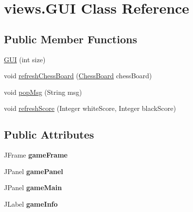 \hypertarget{classviews_1_1_g_u_i}{\section{views.\+G\+U\+I Class Reference}
\label{classviews_1_1_g_u_i}
}
\subsection*{Public Member Functions}
\begin{DoxyCompactItemize}
\item 
\hyperlink{classviews_1_1_g_u_i_aa8f0b37b9ad363a2f41e2471ea1ab903}{G\+U\+I} (int size)
\item 
void \hyperlink{classviews_1_1_g_u_i_aa32d4db201e60136cf0a47eb5fd81614}{refresh\+Chess\+Board} (\hyperlink{classmodel_core_1_1_chess_board}{Chess\+Board} chess\+Board)
\item 
void \hyperlink{classviews_1_1_g_u_i_ad319ff8d77e9f4915e42dde3a665423a}{pop\+Msg} (String msg)
\item 
void \hyperlink{classviews_1_1_g_u_i_ad46f677c2c21d3e6a82408baf061126a}{refresh\+Score} (Integer white\+Score, Integer black\+Score)
\end{DoxyCompactItemize}
\subsection*{Public Attributes}
\begin{DoxyCompactItemize}
\item 
\hypertarget{classviews_1_1_g_u_i_ab848d4682f1a4d057a4c13b76ac18e99}{J\+Frame {\bfseries game\+Frame}}\label{classviews_1_1_g_u_i_ab848d4682f1a4d057a4c13b76ac18e99}

\item 
\hypertarget{classviews_1_1_g_u_i_a19215292f3d3e894912e5263ff3e1dad}{J\+Panel {\bfseries game\+Panel}}\label{classviews_1_1_g_u_i_a19215292f3d3e894912e5263ff3e1dad}

\item 
\hypertarget{classviews_1_1_g_u_i_ae7383d68ae432bf5cccc85ae017c50bd}{J\+Panel {\bfseries game\+Main}}\label{classviews_1_1_g_u_i_ae7383d68ae432bf5cccc85ae017c50bd}

\item 
\hypertarget{classviews_1_1_g_u_i_a112d8e07dd6ae143adefb205103eb4f0}{J\+Label {\bfseries game\+Info}}\label{classviews_1_1_g_u_i_a112d8e07dd6ae143adefb205103eb4f0}

\end{DoxyCompactItemize}


